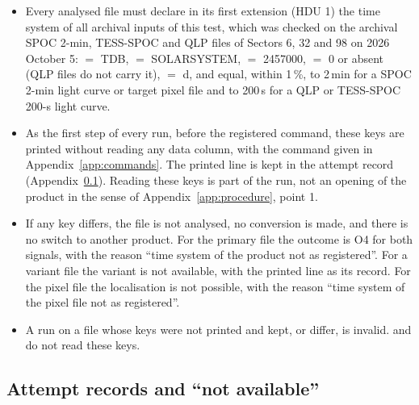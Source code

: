 \begin{itemize}
\item Every analysed file must declare in its first extension (HDU 1) the time system of all archival inputs of this
  test, which was checked on the archival SPOC 2-min, TESS-SPOC and QLP files of Sectors 6, 32 and 98 on 2026 October 5:
   $=$ TDB,  $=$ SOLARSYSTEM,  $=$ 2457000,  $=$ 0 or absent (QLP
  files do not carry it),  $=$ d, and  equal, within 1\,\%, to 2\,min for a SPOC 2-min light
  curve or target pixel file and to 200\,s for a QLP or TESS-SPOC 200-s light curve.
\item As the first step of every run, before the registered command, these keys are printed without reading any data
  column, with the command given in Appendix~\ref{app:commands}. The printed line is kept in the attempt record
  (Appendix~\ref{app:p4}). Reading these keys is part of the run, not an opening of the product in the sense of
  Appendix~\ref{app:procedure}, point 1.
\item If any key differs, the file is not analysed, no conversion is made, and there is no switch to another product.
  For the primary file the outcome is O4 for both signals, with the reason ``time system of the product not as
  registered''. For a variant file the variant is not available, with the printed line as its record. For the pixel
  file the localisation is not possible, with the reason ``time system of the pixel file not as registered''.
\item A run on a file whose keys were not printed and kept, or differ, is invalid.  and
   do not read these keys.
\end{itemize}

\subsection{Attempt records and ``not available''} \label{app:p4}

